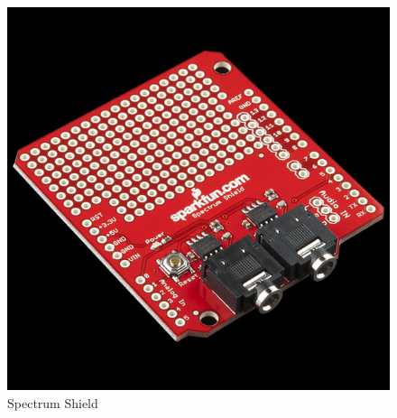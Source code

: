 \documentclass[12pt,a4paper,journal]{IEEEtran}
\begin{document}
\begin{figure}[ht]
  \centering
  \includegraphics[width=0.7\linewidth]{spectrumshield.jpg}
  \caption{Spectrum Shield}
  \label{fig:tas4}
\end{figure}
\end{document}
